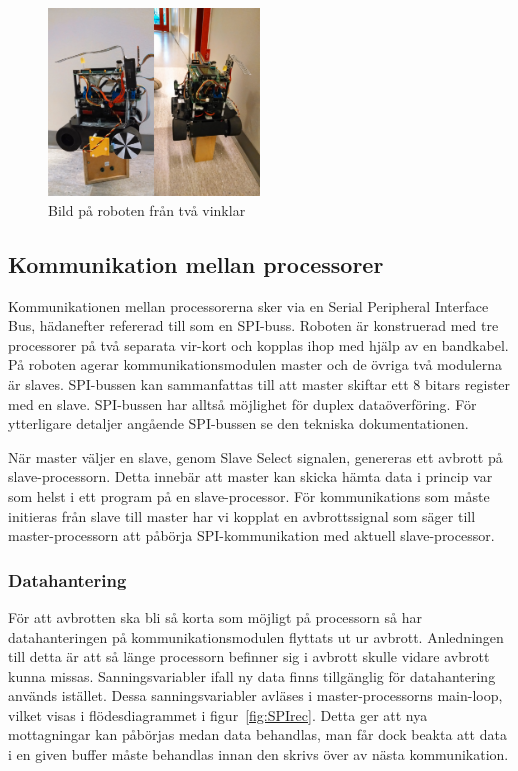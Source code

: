 \documentclass[a4paper,12pt,fleqn]{article}
\begin{document}
\begin{figure}[htp] %
  \begin{center}
  \includegraphics[keepaspectratio=true,width=0.5\textwidth]{robot.png}  %
  \end{center}
  \caption{Bild på roboten från två vinklar} %
  \label{fig:robot}
\end{figure}

\subsection{Kommunikation mellan processorer}
Kommunikationen mellan processorerna sker via en Serial Peripheral Interface Bus, hädanefter refererad till som en SPI-buss.
Roboten är konstruerad med tre processorer på två separata vir-kort och kopplas ihop med hjälp av en bandkabel. På roboten agerar kommunikationsmodulen master och de övriga två modulerna är slaves. SPI-bussen kan sammanfattas till att master skiftar ett 8 bitars register med en slave. SPI-bussen har alltså möjlighet för duplex dataöverföring. För ytterligare detaljer angående SPI-bussen se den tekniska dokumentationen.

När master väljer en slave, genom Slave Select signalen, genereras ett avbrott på slave-processorn. Detta innebär att master kan skicka hämta data i princip var som helst i ett program på en slave-processor. För kommunikations som måste initieras från slave till master har vi kopplat en avbrottssignal som säger till master-processorn att påbörja SPI-kommunikation med aktuell slave-processor.

\subsubsection{Datahantering}
För att avbrotten ska bli så korta som möjligt på processorn så har datahanteringen på kommunikationsmodulen flyttats ut ur avbrott. Anledningen till detta är att så länge processorn befinner sig i avbrott skulle vidare avbrott kunna missas. Sanningsvariabler ifall ny data finns tillgänglig för datahantering används istället. Dessa sanningsvariabler avläses i master-processorns main-loop, vilket visas i flödesdiagrammet i figur~\ref{fig:SPIrec}. Detta ger att nya mottagningar kan påbörjas medan data behandlas, man får dock beakta att data i en given buffer måste behandlas innan den skrivs över av nästa kommunikation.
\end{document}

